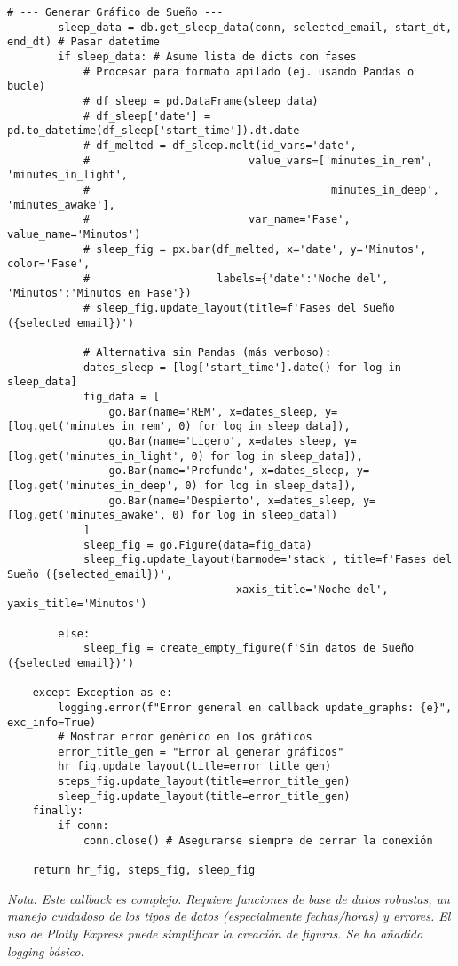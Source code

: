 \begin{lstlisting}[caption={Ejemplo de callback principal en Dash para actualizar gráficos.}, label={lst:dash_callback_code}]
        # --- Generar Gráfico de Sueño ---
        sleep_data = db.get_sleep_data(conn, selected_email, start_dt, end_dt) # Pasar datetime
        if sleep_data: # Asume lista de dicts con fases
            # Procesar para formato apilado (ej. usando Pandas o bucle)
            # df_sleep = pd.DataFrame(sleep_data)
            # df_sleep['date'] = pd.to_datetime(df_sleep['start_time']).dt.date
            # df_melted = df_sleep.melt(id_vars='date',
            #                         value_vars=['minutes_in_rem', 'minutes_in_light',
            #                                     'minutes_in_deep', 'minutes_awake'],
            #                         var_name='Fase', value_name='Minutos')
            # sleep_fig = px.bar(df_melted, x='date', y='Minutos', color='Fase',
            #                    labels={'date':'Noche del', 'Minutos':'Minutos en Fase'})
            # sleep_fig.update_layout(title=f'Fases del Sueño ({selected_email})')

            # Alternativa sin Pandas (más verboso):
            dates_sleep = [log['start_time'].date() for log in sleep_data]
            fig_data = [
                go.Bar(name='REM', x=dates_sleep, y=[log.get('minutes_in_rem', 0) for log in sleep_data]),
                go.Bar(name='Ligero', x=dates_sleep, y=[log.get('minutes_in_light', 0) for log in sleep_data]),
                go.Bar(name='Profundo', x=dates_sleep, y=[log.get('minutes_in_deep', 0) for log in sleep_data]),
                go.Bar(name='Despierto', x=dates_sleep, y=[log.get('minutes_awake', 0) for log in sleep_data])
            ]
            sleep_fig = go.Figure(data=fig_data)
            sleep_fig.update_layout(barmode='stack', title=f'Fases del Sueño ({selected_email})',
                                    xaxis_title='Noche del', yaxis_title='Minutos')

        else:
            sleep_fig = create_empty_figure(f'Sin datos de Sueño ({selected_email})')

    except Exception as e:
        logging.error(f"Error general en callback update_graphs: {e}", exc_info=True)
        # Mostrar error genérico en los gráficos
        error_title_gen = "Error al generar gráficos"
        hr_fig.update_layout(title=error_title_gen)
        steps_fig.update_layout(title=error_title_gen)
        sleep_fig.update_layout(title=error_title_gen)
    finally:
        if conn:
            conn.close() # Asegurarse siempre de cerrar la conexión

    return hr_fig, steps_fig, sleep_fig

\end{lstlisting}
\textit{Nota: Este callback es complejo. Requiere funciones de base de datos robustas, un manejo cuidadoso de los tipos de datos (especialmente fechas/horas) y errores. El uso de Plotly Express puede simplificar la creación de figuras. Se ha añadido logging básico.}

